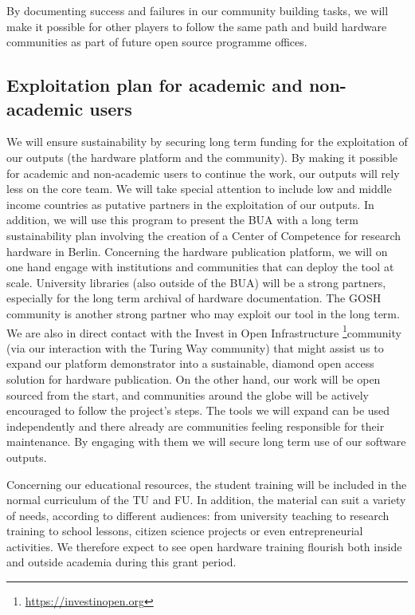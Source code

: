 \documentclass[
  12pt,
  a4paper,
]{article}
\begin{document}
By documenting success and failures in our community building tasks, we
will make it possible for other players to follow the same path and
build hardware communities as part of future open source programme
offices.

\hypertarget{exploitation-plan-for-academic-and-non-academic-users}{%
\subsection{Exploitation plan for academic and non-academic
users}\label{exploitation-plan-for-academic-and-non-academic-users}}

We will ensure sustainability by securing long term funding for the
exploitation of our outputs (the hardware platform and the community).
By making it possible for academic and non-academic users to continue
the work, our outputs will rely less on the core team. We will take
special attention to include low and middle income countries as putative
partners in the exploitation of our outputs. In addition, we will use
this program to present the BUA with a long term sustainability plan
involving the creation of a Center of Competence for research hardware
in Berlin. Concerning the hardware publication platform, we will on one
hand engage with institutions and communities that can deploy the tool
at scale. University libraries (also outside of the BUA) will be a
strong partners, especially for the long term archival of hardware
documentation. The GOSH community is another strong partner who may
exploit our tool in the long term. We are also in direct contact with
the Invest in Open Infrastructure \footnote{\url{https://investinopen.org}}community
(via our interaction with the Turing Way community) that might assist us
to expand our platform demonstrator into a sustainable, diamond open
access solution for hardware publication. On the other hand, our work
will be open sourced from the start, and communities around the globe
will be actively encouraged to follow the project's steps. The tools we
will expand can be used independently and there already are communities
feeling responsible for their maintenance. By engaging with them we will
secure long term use of our software outputs.

Concerning our educational resources, the student training will be
included in the normal curriculum of the TU and FU. In addition, the
material can suit a variety of needs, according to different audiences:
from university teaching to research training to school lessons, citizen
science projects or even entrepreneurial activities. We therefore expect
to see open hardware training flourish both inside and outside academia
during this grant period.
\end{document}
